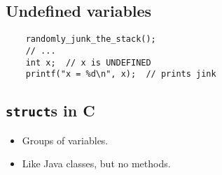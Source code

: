 \subsection{Undefined variables}
\begin{verbatim}
	randomly_junk_the_stack();
	// ...
	int x;  // x is UNDEFINED
	printf("x = %d\n", x);  // prints jink
\end{verbatim}

\subsection{\texttt{struct}s in C}
\begin{itemize}
	\item Groups of variables.
	\item Like Java classes, but no methods.
\end{itemize}